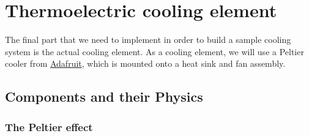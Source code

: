 
\chapter{Thermoelectric cooling element}

The final part that we need to implement in order to build a sample cooling system is the actual cooling element. As a cooling element, we will use a Peltier cooler from \href{https://www.adafruit.com/product/1335}{Adafruit}, which is mounted onto a heat sink and fan assembly.


\section{Components and their Physics}

\subsection{The Peltier effect}


